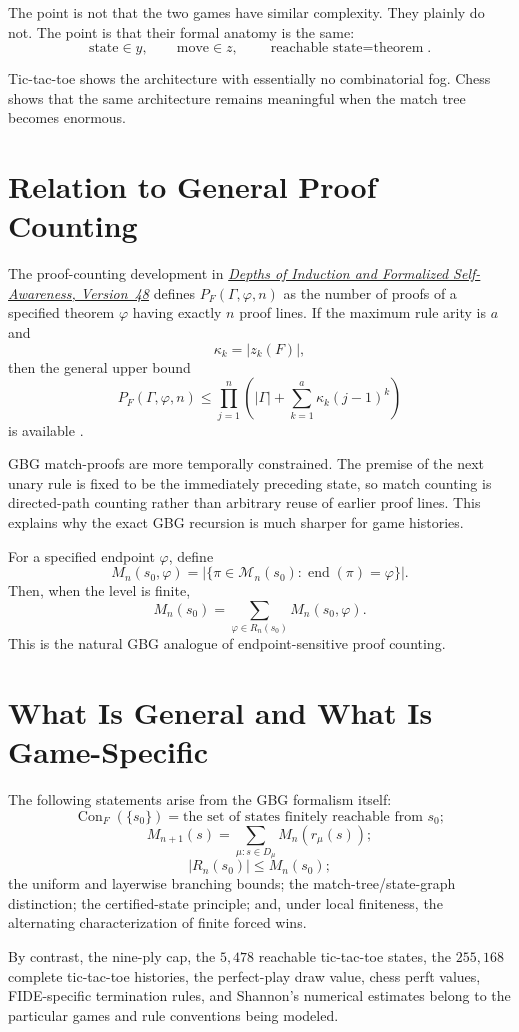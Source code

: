 \documentclass[11pt]{article}
\theoremstyle{definition}
\theoremstyle{remark}
\newcommand{\Con}{\operatorname{Con}}
\newcommand{\DepthsRef}{\href{https://btenneson.github.io/pub/cs.LO_Logic_in_Computer_Science/depths_of_induction_v48/}{\emph{Depths of Induction and Formalized Self-Awareness, \mbox{Version~48}}}}
\begin{document}
The point is not that the two games have similar complexity. They plainly do not. The point is that their formal anatomy is the same:
\[
\boxed{\text{state}\in y},
\qquad
\boxed{\text{move}\in z},
\qquad
\boxed{\text{reachable state}=\text{theorem}}.
\]

Tic-tac-toe shows the architecture with essentially no combinatorial fog. Chess shows that the same architecture remains meaningful when the match tree becomes enormous.

\section{Relation to General Proof Counting}

The proof-counting development in \DepthsRef{} defines $P_F(\Gamma,\varphi,n)$ as the number of proofs of a specified theorem $\varphi$ having exactly $n$ proof lines. If the maximum rule arity is $a$ and
\[
\kappa_k=|z_k(F)|,
\]
then the general upper bound
\[
P_F(\Gamma,\varphi,n)
\le
\prod_{j=1}^{n}
\left(
|\Gamma|+\sum_{k=1}^{a}\kappa_k(j-1)^k
\right)
\]
is available \cite{Tenneson2026}.

GBG match-proofs are more temporally constrained. The premise of the next unary rule is fixed to be the immediately preceding state, so match counting is directed-path counting rather than arbitrary reuse of earlier proof lines. This explains why the exact GBG recursion is much sharper for game histories.

For a specified endpoint $\varphi$, define
\[
M_n(s_0,\varphi)=
|\{\pi\in\mathcal M_n(s_0):\operatorname{end}(\pi)=\varphi\}|.
\]
Then, when the level is finite,
\[
M_n(s_0)=\sum_{\varphi\in R_n(s_0)}M_n(s_0,\varphi).
\]
This is the natural GBG analogue of endpoint-sensitive proof counting.

\section{What Is General and What Is Game-Specific}

The following statements arise from the GBG formalism itself:
\[
\Con_F(\{s_0\})=\text{the set of states finitely reachable from }s_0;
\]
\[
M_{n+1}(s)=\sum_{\mu:s\in D_\mu}M_n(r_\mu(s));
\]
\[
|R_n(s_0)|\le M_n(s_0);
\]
the uniform and layerwise branching bounds; the match-tree/state-graph distinction; the certified-state principle; and, under local finiteness, the alternating characterization of finite forced wins.

By contrast, the nine-ply cap, the $5,478$ reachable tic-tac-toe states, the $255,168$ complete tic-tac-toe histories, the perfect-play draw value, chess perft values, FIDE-specific termination rules, and Shannon's numerical estimates belong to the particular games and rule conventions being modeled.
\end{document}
